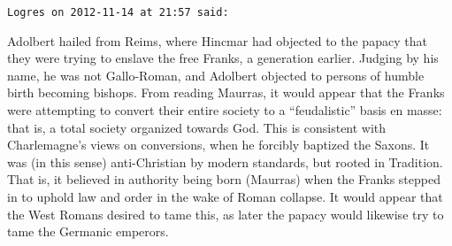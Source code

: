 \begin{footnotesize}
\begin{sffamily}
\texttt{Logres on 2012-11-14 at 21:57 said:}

Adolbert hailed from Reims, where Hincmar had objected to the papacy that they were trying to enslave the free Franks, a generation earlier. Judging by his name, he was not Gallo-Roman, and Adolbert objected to persons of humble birth becoming bishops. From reading Maurras, it would appear that the Franks were attempting to convert their entire society to a ``feudalistic'' basis en masse: that is, a total society organized towards God. This is consistent with Charlemagne's views on conversions, when he forcibly baptized the Saxons. It was (in this sense) anti-Christian by modern standards, but rooted in Tradition. That is, it believed in authority being born (Maurras) when the Franks stepped in to uphold law and order in the wake of Roman collapse. It would appear that the West Romans desired to tame this, as later the papacy would likewise try to tame the Germanic emperors.


\hfill

\end{sffamily}
\end{footnotesize}

